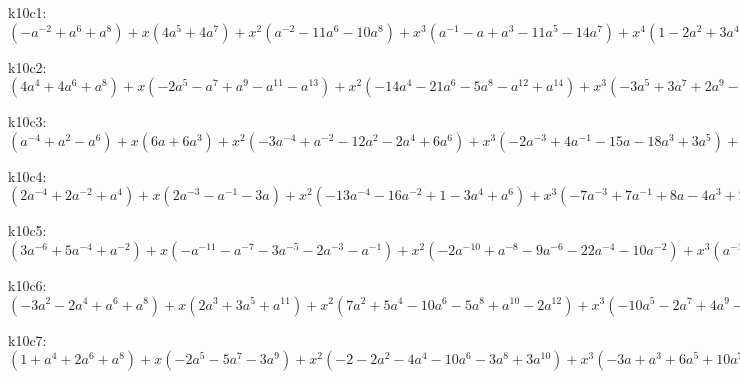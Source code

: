 k10c1: $ (-a^{-2}+a^{6}+a^{8}) +x(4a^{5}+4a^{7}) +x^{2}(a^{-2}-11a^{6}-10a^{8}) +x^{3}(a^{-1}-a+a^{3}-11a^{5}-14a^{7}) +x^{4}(1-2a^{2}+3a^{4}+21a^{6}+15a^{8}) +x^{5}(a-3a^{3}+12a^{5}+16a^{7}) +x^{6}(a^{2}-4a^{4}-12a^{6}-7a^{8}) +x^{7}(a^{3}-6a^{5}-7a^{7}) +x^{8}(a^{4}+2a^{6}+a^{8}) +x^{9}(a^{5}+a^{7}) $

k10c2: $ (4a^{4}+4a^{6}+a^{8}) +x(-2a^{5}-a^{7}+a^{9}-a^{11}-a^{13}) +x^{2}(-14a^{4}-21a^{6}-5a^{8}-a^{12}+a^{14}) +x^{3}(-3a^{5}+3a^{7}+2a^{9}-2a^{11}+2a^{13}) +x^{4}(16a^{4}+33a^{6}+11a^{8}-4a^{10}+2a^{12}) +x^{5}(10a^{5}+2a^{7}-6a^{9}+2a^{11}) +x^{6}(-7a^{4}-18a^{6}-9a^{8}+2a^{10}) +x^{7}(-6a^{5}-4a^{7}+2a^{9}) +x^{8}(a^{4}+3a^{6}+2a^{8}) +x^{9}(a^{5}+a^{7}) $

k10c3: $ (a^{-4}+a^{2}-a^{6}) +x(6a+6a^{3}) +x^{2}(-3a^{-4}+a^{-2}-12a^{2}-2a^{4}+6a^{6}) +x^{3}(-2a^{-3}+4a^{-1}-15a-18a^{3}+3a^{5}) +x^{4}(a^{-4}-2a^{-2}+6+18a^{2}+4a^{4}-5a^{6}) +x^{5}(a^{-3}-3a^{-1}+15a+15a^{3}-4a^{5}) +x^{6}(a^{-2}-4-10a^{2}-4a^{4}+a^{6}) +x^{7}(a^{-1}-6a-6a^{3}+a^{5}) +x^{8}(1+2a^{2}+a^{4}) +x^{9}(a+a^{3}) $

k10c4: $ (2a^{-4}+2a^{-2}+a^{4}) +x(2a^{-3}-a^{-1}-3a) +x^{2}(-13a^{-4}-16a^{-2}+1-3a^{4}+a^{6}) +x^{3}(-7a^{-3}+7a^{-1}+8a-4a^{3}+2a^{5}) +x^{4}(16a^{-4}+29a^{-2}+4-6a^{2}+3a^{4}) +x^{5}(11a^{-3}-2a^{-1}-10a+3a^{3}) +x^{6}(-7a^{-4}-17a^{-2}-7+3a^{2}) +x^{7}(-6a^{-3}-3a^{-1}+3a) +x^{8}(a^{-4}+3a^{-2}+2) +x^{9}(a^{-3}+a^{-1}) $

k10c5: $ (3a^{-6}+5a^{-4}+a^{-2}) +x(-a^{-11}-a^{-7}-3a^{-5}-2a^{-3}-a^{-1}) +x^{2}(-2a^{-10}+a^{-8}-9a^{-6}-22a^{-4}-10a^{-2}) +x^{3}(a^{-11}-a^{-9}+3a^{-7}+6a^{-5}+7a^{-3}+6a^{-1}) +x^{4}(2a^{-10}-2a^{-8}+10a^{-6}+32a^{-4}+18a^{-2}) +x^{5}(2a^{-9}-4a^{-7}-3a^{-5}-2a^{-3}-5a^{-1}) +x^{6}(2a^{-8}-7a^{-6}-20a^{-4}-11a^{-2}) +x^{7}(2a^{-7}-2a^{-5}-3a^{-3}+a^{-1}) +x^{8}(2a^{-6}+4a^{-4}+2a^{-2}) +x^{9}(a^{-5}+a^{-3}) $

k10c6: $ (-3a^{2}-2a^{4}+a^{6}+a^{8}) +x(2a^{3}+3a^{5}+a^{11}) +x^{2}(7a^{2}+5a^{4}-10a^{6}-5a^{8}+a^{10}-2a^{12}) +x^{3}(-10a^{5}-2a^{7}+4a^{9}-4a^{11}) +x^{4}(-5a^{2}-3a^{4}+18a^{6}+12a^{8}-3a^{10}+a^{12}) +x^{5}(-3a^{3}+8a^{5}+5a^{7}-4a^{9}+2a^{11}) +x^{6}(a^{2}-2a^{4}-12a^{6}-7a^{8}+2a^{10}) +x^{7}(a^{3}-4a^{5}-3a^{7}+2a^{9}) +x^{8}(a^{4}+3a^{6}+2a^{8}) +x^{9}(a^{5}+a^{7}) $

k10c7: $ (1+a^{4}+2a^{6}+a^{8}) +x(-2a^{5}-5a^{7}-3a^{9}) +x^{2}(-2-2a^{2}-4a^{4}-10a^{6}-3a^{8}+3a^{10}) +x^{3}(-3a+a^{3}+6a^{5}+10a^{7}+8a^{9}) +x^{4}(1-a^{2}+8a^{4}+20a^{6}+6a^{8}-4a^{10}) +x^{5}(2a-2a^{3}-2a^{5}-6a^{7}-8a^{9}) +x^{6}(2a^{2}-5a^{4}-15a^{6}-7a^{8}+a^{10}) +x^{7}(2a^{3}-a^{5}-a^{7}+2a^{9}) +x^{8}(2a^{4}+4a^{6}+2a^{8}) +x^{9}(a^{5}+a^{7}) $

